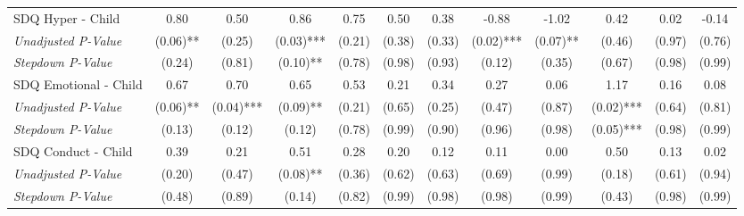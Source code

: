 \begin{tabular}{l c c c c c c c c c c c}
SDQ Hyper - Child & 0.80 & 0.50 & 0.86 & 0.75 & 0.50 & 0.38 & -0.88 & -1.02 & 0.42 & 0.02 & -0.14 \\
\quad \textit{Unadjusted P-Value} & (0.06)** & (0.25) & (0.03)*** & (0.21) & (0.38) & (0.33) & (0.02)*** & (0.07)** & (0.46) & (0.97) & (0.76) \\
\quad \textit{Stepdown P-Value} & (0.24) & (0.81) & (0.10)** & (0.78) & (0.98) & (0.93) & (0.12) & (0.35) & (0.67) & (0.98) & (0.99) \\
SDQ Emotional - Child & 0.67 & 0.70 & 0.65 & 0.53 & 0.21 & 0.34 & 0.27 & 0.06 & 1.17 & 0.16 & 0.08 \\
\quad \textit{Unadjusted P-Value} & (0.06)** & (0.04)*** & (0.09)** & (0.21) & (0.65) & (0.25) & (0.47) & (0.87) & (0.02)*** & (0.64) & (0.81) \\
\quad \textit{Stepdown P-Value} & (0.13) & (0.12) & (0.12) & (0.78) & (0.99) & (0.90) & (0.96) & (0.98) & (0.05)*** & (0.98) & (0.99) \\
SDQ Conduct - Child & 0.39 & 0.21 & 0.51 & 0.28 & 0.20 & 0.12 & 0.11 & 0.00 & 0.50 & 0.13 & 0.02 \\
\quad \textit{Unadjusted P-Value} & (0.20) & (0.47) & (0.08)** & (0.36) & (0.62) & (0.63) & (0.69) & (0.99) & (0.18) & (0.61) & (0.94) \\
\quad \textit{Stepdown P-Value} & (0.48) & (0.89) & (0.14) & (0.82) & (0.99) & (0.98) & (0.98) & (0.99) & (0.43) & (0.98) & (0.99) \\
\bottomrule
\end{tabular}
